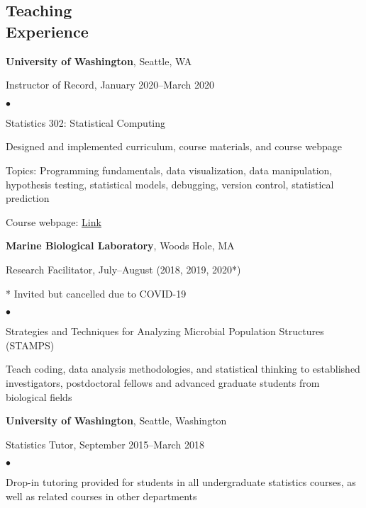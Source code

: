 \documentclass[margin,centered]{res}
\newenvironment{list1}{
  \begin{list}{\ding{113}}{%
      \setlength{\itemsep}{0in}
      \setlength{\parsep}{0in} \setlength{\parskip}{0in}
      \setlength{\topsep}{0in} \setlength{\partopsep}{0in}
      \setlength{\leftmargin}{0.17in}}}{\end{list}}
\newenvironment{list2}{
  \begin{list}{$\bullet$}{%
      \setlength{\itemsep}{0in}
      \setlength{\parsep}{0in} \setlength{\parskip}{0in}
      \setlength{\topsep}{0in} \setlength{\partopsep}{0in}
      \setlength{\leftmargin}{0.2in}}}{\end{list}}
\begin{document}
\begin{resume}
\section{\sc Teaching \\ Experience}
{\bf University of Washington}, Seattle, WA
\begin{list1}
\item[] Instructor of Record, January 2020--March 2020
\begin{list2}
\vspace*{.05in}
\item Statistics 302: Statistical Computing
\item Designed and implemented curriculum, course materials, and course webpage
\item Topics: Programming fundamentals, data visualization, data manipulation, hypothesis testing, statistical models, debugging, version control, statistical prediction
\item Course webpage: \href{https://bryandmartin.github.io/STAT302}{Link}
\end{list2}
\end{list1}


{\bf Marine Biological Laboratory}, Woods Hole, MA
\begin{list1}
\item[] Research Facilitator, July--August (2018, 2019, 2020*)
\item[] * Invited but cancelled due to COVID-19
\begin{list2}
\vspace*{.05in}
\item Strategies and Techniques for Analyzing Microbial Population Structures (STAMPS)
\item Teach coding, data analysis methodologies, and statistical thinking to established investigators, postdoctoral fellows and advanced graduate students from biological fields
\end{list2}
\end{list1}

{\bf University of Washington}, Seattle, Washington
\begin{list1}
\item[] Statistics Tutor, September 2015--March 2018
\begin{list2}
\vspace*{.05in}
\item Drop-in tutoring provided for students in all undergraduate statistics courses, as well as related courses in other departments
\end{list2}
\end{list1}


\end{resume}
\end{document}
